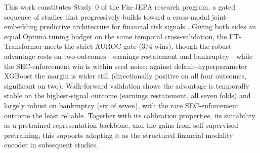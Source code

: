 This work constitutes Study~0 of the Fin-JEPA research program, a gated sequence of studies that progressively builds toward a cross-modal joint-embedding predictive architecture for financial risk signals \citep{assran2023self}. Giving both sides an equal Optuna tuning budget on the same temporal cross-validation, the FT-Transformer meets the strict AUROC gate (3/4 wins), though the robust advantage rests on two outcomes---earnings restatement and bankruptcy---while the SEC-enforcement win is within seed noise; against default-hyperparameter XGBoost the margin is wider still (directionally positive on all four outcomes, significant on two). Walk-forward validation shows the advantage is temporally stable on the highest-signal outcome (earnings restatement, all seven folds) and largely robust on bankruptcy (six of seven), with the rare SEC-enforcement outcome the least reliable. Together with its calibration properties, its suitability as a pretrained representation backbone, and the gains from self-supervised pretraining, this supports adopting it as the structured financial modality encoder in subsequent studies.
